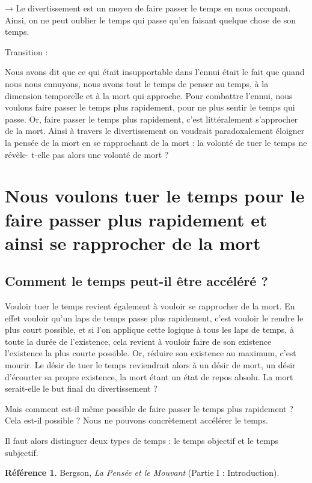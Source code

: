 \documentclass[french]{book}
\theoremstyle{definition}
\newtheorem*{refe}{Référence}
\begin{document}
→ Le divertissement est un moyen de faire passer le temps en nous occupant. Ainsi, on ne peut oublier le temps qui passe qu’en faisant quelque chose de son temps.

Transition :

Nous avons dit que ce qui était insupportable dans l’ennui était le fait que quand nous nous ennuyons, nous avons tout le temps de penser au temps, à la dimension temporelle et à la mort qui approche. Pour combattre l’ennui, nous voulons faire passer le temps plus rapidement, pour ne plus sentir le temps qui passe. Or, faire passer le temps plus rapidement, c’est littéralement s’approcher de la mort. Ainsi à travers le divertissement on voudrait paradoxalement éloigner la pensée de la mort en se rapprochant de la mort : la volonté de tuer le temps ne révèle- t-elle pas alors une volonté de mort ?

\section{Nous voulons tuer le temps pour le faire passer plus rapidement et ainsi se rapprocher de la mort}

\subsection{Comment le temps peut-il être accéléré ?}

Vouloir tuer le temps revient également à vouloir se rapprocher de la mort. En effet vouloir qu’un laps de temps passe plus rapidement, c’est vouloir le rendre le plus court possible, et si l’on applique cette logique à tous les laps de temps, à toute la durée de l’existence, cela revient à vouloir faire de son existence l’existence la plus courte possible. Or, réduire son existence au maximum, c’est mourir. Le désir de tuer le temps reviendrait alors à un désir de mort, un désir d’écourter sa propre existence, la mort étant un état de repos absolu. La mort serait-elle le but final du divertissement ?

Mais comment est-il même possible de faire passer le temps plus rapidement ? Cela est-il possible ? Nous ne pouvons concrètement accélérer le temps.

Il faut alors distinguer deux types de temps : le temps objectif et le temps subjectif.

\begin{refe}
	Bergson, \textit{La Pensée et le Mouvant} (Partie I : Introduction).
\end{refe}
\end{document}
